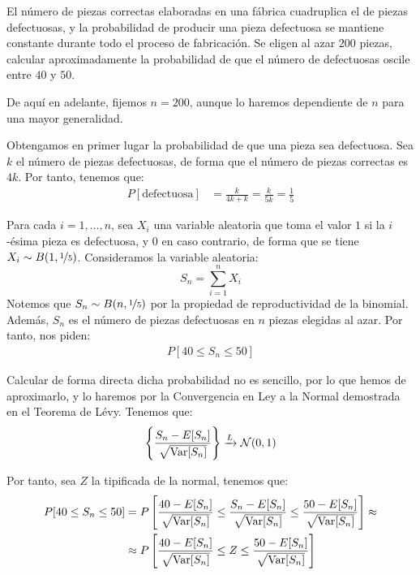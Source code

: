 \begin{ejercicio}
    El número de piezas correctas elaboradas en una fábrica cuadruplica el de piezas defectuosas, y la probabilidad de producir una pieza defectuosa se mantiene constante durante todo el proceso de fabricación. Se eligen al azar $200$ piezas, calcular aproximadamente la probabilidad de que el número de defectuosas oscile entre $40$ y $50$.

    De aquí en adelante, fijemos $n=200$, aunque lo haremos dependiente de $n$ para una mayor generalidad.

    Obtengamos en primer lugar la probabilidad de que una pieza sea defectuosa. Sea $k$ el número de piezas defectuosas, de forma que el número de piezas correctas es $4k$. Por tanto, tenemos que:
    \begin{align*}
        P[\text{defectuosa}] &= \frac{k}{4k+k} = \frac{k}{5k} = \frac{1}{5}
    \end{align*}

    Para cada $i=1, \ldots, n$, sea $X_i$ una variable aleatoria que toma el valor $1$ si la $i$-ésima pieza es defectuosa, y $0$ en caso contrario, de forma que se tiene $X_i \sim B(1, \nicefrac{1}{5})$. Consideramos la variable aleatoria:
    \[
        S_{n} = \sum_{i=1}^{n} X_i
    \]
    Notemos que $S_{n} \sim B(n, \nicefrac{1}{5})$ por la propiedad de reproductividad de la binomial. Además, $S_{n}$ es el número de piezas defectuosas en $n$ piezas elegidas al azar. Por tanto, nos piden:
    \begin{align*}
        P[40 \leq S_{n} \leq 50]
    \end{align*}

    Calcular de forma directa dicha probabilidad no es sencillo, por lo que hemos de aproximarlo, y lo haremos por la Convergencia en Ley a la Normal demostrada en el Teorema de Lévy. Tenemos que:
    \begin{equation*}
        \left\{\frac{S_{n}-E[S_n]}{\sqrt{\operatorname{Var}[S_{n}]}}\right\} \xrightarrow{L} \mathcal{N}(0,1)
    \end{equation*}

    Por tanto, sea $Z$ la tipificada de la normal, tenemos que:
    \begin{align*}
        P[40 \leq S_{n} \leq 50] &= P\left[\frac{40 - E[S_n]}{\sqrt{\operatorname{Var}[S_{n}]}} \leq \frac{S_{n}-E[S_n]}{\sqrt{\operatorname{Var}[S_{n}]}} \leq \frac{50 - E[S_n]}{\sqrt{\operatorname{Var}[S_{n}]}}\right]
        \approx\\&\approx P\left[\frac{40 - E[S_n]}{\sqrt{\operatorname{Var}[S_{n}]}} \leq Z \leq \frac{50 - E[S_n]}{\sqrt{\operatorname{Var}[S_{n}]}}\right]
    \end{align*}


\end{ejercicio}
